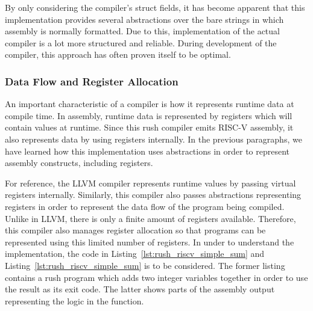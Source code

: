 By only considering the compiler's struct fields, it has become apparent that this implementation provides several abstractions over the bare strings in which assembly is normally formatted.
Due to this, implementation of the actual compiler is a lot more structured and reliable.
During development of the compiler, this approach has often proven itself to be optimal.

\subsubsection{Data Flow and Register Allocation}

An important characteristic of a compiler is how it represents runtime data at compile time.
In assembly, runtime data is represented by registers which will contain values at runtime.
Since this rush compiler emits RISC-V assembly, it also represents data by using registers internally.
In the previous paragraphs, we have learned how this implementation uses abstractions in order to represent assembly constructs, including registers.

For reference, the LLVM compiler represents runtime values by passing virtual registers internally.
Similarly, this compiler also passes abstractions representing registers in order to represent the data flow of the program being compiled.
Unlike in LLVM, there is only a finite amount of registers available.
Therefore, this compiler also manages register allocation so that programs can be represented using this limited number of registers.
In under to understand the implementation, the code in Listing~\ref{lst:rush_riscv_simple_sum} and Listing~\ref{lst:rush_riscv_simple_sum} is to be considered.
The former listing contains a rush program which adds two integer variables together in order to use the result as its exit code.
The latter shows parts of the assembly output representing the logic in the  function.

\begin{minipage}{.34\textwidth}
	\center
\end{minipage}%
\hspace{3cm}
\begin{minipage}{.45\textwidth}
	\center
\end{minipage}

